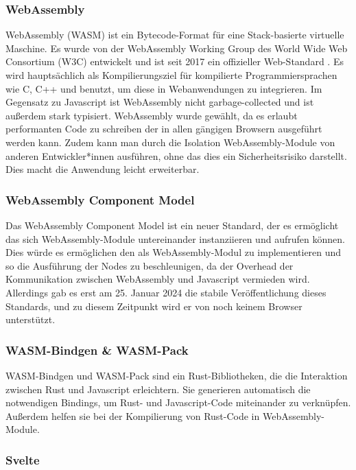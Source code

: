 \documentclass[ngerman]{article}
\begin{document}
\subsubsection{WebAssembly}
WebAssembly (WASM) ist ein Bytecode-Format für eine Stack-basierte virtuelle Maschine. Es wurde von der WebAssembly Working Group des World Wide Web Consortium (W3C) entwickelt und ist seit 2017 ein offizieller Web-Standard \cite{Haas2017}. 
\br
Es wird hauptsächlich als Kompilierungsziel für kompilierte Programmiersprachen wie C, C++ und  benutzt, um diese in Webanwendungen zu integrieren. Im Gegensatz zu Javascript ist WebAssembly nicht garbage-collected und ist außerdem stark typisiert.
\br
WebAssembly wurde gewählt, da es erlaubt performanten Code zu schreiben der in allen gängigen Browsern ausgeführt werden kann. 
Zudem kann man durch die Isolation WebAssembly-Module von anderen Entwickler*innen ausführen, ohne das dies ein Sicherheitsrisiko darstellt. Dies macht die Anwendung leicht erweiterbar.
\subsubsection*{WebAssembly Component Model}
Das WebAssembly Component Model ist ein neuer Standard, der es ermöglicht das sich WebAssembly-Module untereinander instanziieren und aufrufen können. \cite{bytecodeallianceIntroductionWebAssembly} 
Dies würde es ermöglichen den  als WebAssembly-Modul zu implementieren und so die Ausführung der Nodes zu beschleunigen, da der Overhead der Kommunikation zwischen WebAssembly und Javascript vermieden wird. Allerdings gab es erst am 25. Januar 2024 die stabile Veröffentlichung dieses Standards, und zu diesem Zeitpunkt wird er von noch keinem Browser unterstützt.

\subsubsection{WASM-Bindgen \& WASM-Pack}
\label{sec:WASM-Bindgen}

WASM-Bindgen und WASM-Pack sind ein Rust-Bibliotheken, die die Interaktion zwischen Rust und Javascript erleichtern. Sie generieren automatisch die notwendigen Bindings, um Rust- und Javascript-Code miteinander zu verknüpfen. Außerdem helfen sie bei der Kompilierung von Rust-Code in WebAssembly-Module. 
\cite{rustwasmIntroductionwasmbindgen}

\subsubsection{Svelte}
\label{sec:Svelte}
\end{document}

